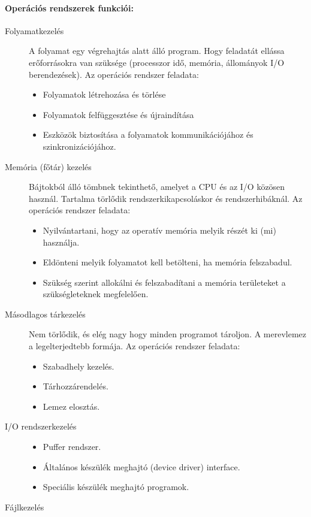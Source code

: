\paragraph{Operációs rendszerek funkciói:}
\begin{description}
\item[Folyamatkezelés]
A folyamat egy végrehajtás alatt álló program. Hogy feladatát ellássa erőforrásokra van szüksége (processzor idő, memória, állományok I/O berendezések).
Az operációs rendszer feladata:
\begin{itemize}
	\item Folyamatok létrehozása és törlése
	\item Folyamatok felfüggesztése és újraindítása
	\item Eszközök biztosítása a folyamatok kommunikációjához és szinkronizációjához.
\end{itemize}
\item[Memória (főtár) kezelés]
Bájtokból álló tömbnek tekinthető, amelyet a CPU és az I/O közösen használ. Tartalma törlődik rendszerkikapcsoláskor és rendszerhibáknál.
Az operációs rendszer feladata:
\begin{itemize}
	\item Nyilvántartani, hogy az operatív memória melyik részét ki (mi) használja.
	\item Eldönteni melyik folyamatot kell betölteni, ha memória felszabadul.
	\item Szükség szerint allokálni és felszabadítani a memória területeket a szükségleteknek megfelelően.
\end{itemize}
\item[Másodlagos tárkezelés]
Nem törlődik, és elég nagy hogy minden programot tároljon. A merevlemez a legelterjedtebb
formája. Az operációs rendszer feladata:
\begin{itemize}
	\item Szabadhely kezelés.
	\item Tárhozzárendelés.
	\item Lemez elosztás.
\end{itemize}
\item[I/O rendszerkezelés]
\begin{itemize}
	\item Puffer rendszer.
	\item Általános készülék meghajtó (device driver) interface.
	\item Speciális készülék meghajtó programok.
\end{itemize}
\item[Fájlkezelés]

\end{description}
